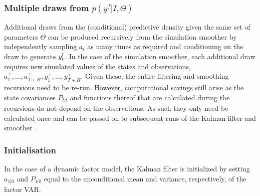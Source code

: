 \documentclass[notitlepage,a4paper,12pt]{article}
\begin{document}
\begin{ThreePartTable}
\subsubsection*{Multiple draws from $p(y^f|I, \Theta)$}
Additional draws from the (conditional) predictive density given the same set of parameters $\Theta$ can be produced recursively from the \citet{carterkohn1994_biomtr} simulation smoother by independently sampling $a_t$ as many times as required and conditioning on the draw to generate $y^{\sf{f}}_t$. In the case of the \citet{durbinkoopman2002_biomtr} simulation smoother, each additional draw requires new simulated values of the states and observations, $a^+_1, \dots, a^+_{T+H}, y^+_1, \dots, y^+_{T+H}$. Given these, the entire filtering and smoothing recursions need to be re-run. However, computational savings still arise as the state covariances $P_{t|t}$ and functions thereof that are calculated during the recursions do not depend on the observations. As such they only need be calculated once and can be passed on to subsequent runs of the Kalman filter and smoother \citep[p. 606]{durbinkoopman2002_biomtr}.

\subsubsection*{Initialisation}

In the case of a dynamic factor model, the Kalman filter is initialized by setting $a_{1|0}$ and $P_{1|0}$ equal to the unconditional mean and variance, respectively, of the factor VAR.

\pagebreak





\end{ThreePartTable}
\end{document}
